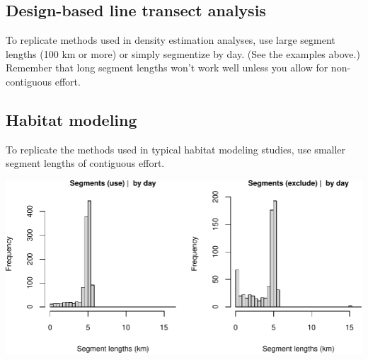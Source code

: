 \documentclass[
]{book}
\newenvironment{Shaded}{\begin{snugshade}}{\end{snugshade}}
\newcommand{\AttributeTok}[1]{\textcolor[rgb]{0.77,0.63,0.00}{#1}}
\newcommand{\CommentTok}[1]{\textcolor[rgb]{0.56,0.35,0.01}{\textit{#1}}}
\newcommand{\ConstantTok}[1]{\textcolor[rgb]{0.00,0.00,0.00}{#1}}
\newcommand{\DecValTok}[1]{\textcolor[rgb]{0.00,0.00,0.81}{#1}}
\newcommand{\FunctionTok}[1]{\textcolor[rgb]{0.00,0.00,0.00}{#1}}
\newcommand{\NormalTok}[1]{#1}
\newcommand{\OtherTok}[1]{\textcolor[rgb]{0.56,0.35,0.01}{#1}}
\newcommand{\SpecialCharTok}[1]{\textcolor[rgb]{0.00,0.00,0.00}{#1}}
\newcommand{\StringTok}[1]{\textcolor[rgb]{0.31,0.60,0.02}{#1}}
\begin{document}
\hypertarget{design-based-line-transect-analysis}{%
\subsection*{Design-based line transect analysis}\label{design-based-line-transect-analysis}}

To replicate methods used in density estimation analyses, use large segment lengths (100 km or more) or simply segmentize by day. (See the examples above.) Remember that long segment lengths won't work well unless you allow for non-contiguous effort.

\hypertarget{habitat-modeling}{%
\subsection*{Habitat modeling}\label{habitat-modeling}}

To replicate the methods used in typical habitat modeling studies, use smaller segment lengths of contiguous effort.

\begin{Shaded}
\end{Shaded}

\includegraphics{figures/unnamed-chunk-402-1.pdf}
\end{document}
